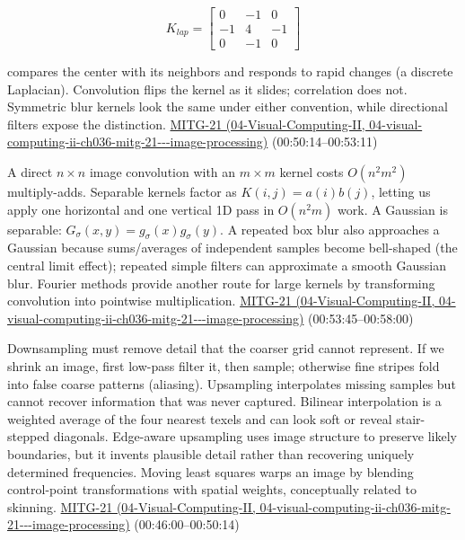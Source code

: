 \[
K_{lap}=\begin{bmatrix}0&-1&0\\-1&4&-1\\0&-1&0\end{bmatrix}
\]

compares the center with its neighbors and responds to rapid changes (a discrete Laplacian). Convolution flips the kernel as it slides; correlation does not. Symmetric blur kernels look the same under either convention, while directional filters expose the distinction. \href{../04-Visual-Computing-II/main.pdf\#nameddest=04-visual-computing-ii-ch036-mitg-21---image-processing}{MITG-21 (04-Visual-Computing-II, 04-visual-computing-ii-ch036-mitg-21-\/-\/-image-processing)} (00:50:14--00:53:11)

A direct \(n\times n\) image convolution with an \(m\times m\) kernel costs \(O(n^2m^2)\) multiply-adds. Separable kernels factor as \(K(i,j)=a(i)b(j)\), letting us apply one horizontal and one vertical 1D pass in \(O(n^2m)\) work. A Gaussian is separable: \(G_\sigma(x,y)=g_\sigma(x)g_\sigma(y)\). A repeated box blur also approaches a Gaussian because sums/averages of independent samples become bell-shaped (the central limit effect); repeated simple filters can approximate a smooth Gaussian blur. Fourier methods provide another route for large kernels by transforming convolution into pointwise multiplication. \href{../04-Visual-Computing-II/main.pdf\#nameddest=04-visual-computing-ii-ch036-mitg-21---image-processing}{MITG-21 (04-Visual-Computing-II, 04-visual-computing-ii-ch036-mitg-21-\/-\/-image-processing)} (00:53:45--00:58:00)

Downsampling must remove detail that the coarser grid cannot represent. If we shrink an image, first low-pass filter it, then sample; otherwise fine stripes fold into false coarse patterns (aliasing). Upsampling interpolates missing samples but cannot recover information that was never captured. Bilinear interpolation is a weighted average of the four nearest texels and can look soft or reveal stair-stepped diagonals. Edge-aware upsampling uses image structure to preserve likely boundaries, but it invents plausible detail rather than recovering uniquely determined frequencies. Moving least squares warps an image by blending control-point transformations with spatial weights, conceptually related to skinning. \href{../04-Visual-Computing-II/main.pdf\#nameddest=04-visual-computing-ii-ch036-mitg-21---image-processing}{MITG-21 (04-Visual-Computing-II, 04-visual-computing-ii-ch036-mitg-21-\/-\/-image-processing)} (00:46:00--00:50:14)

